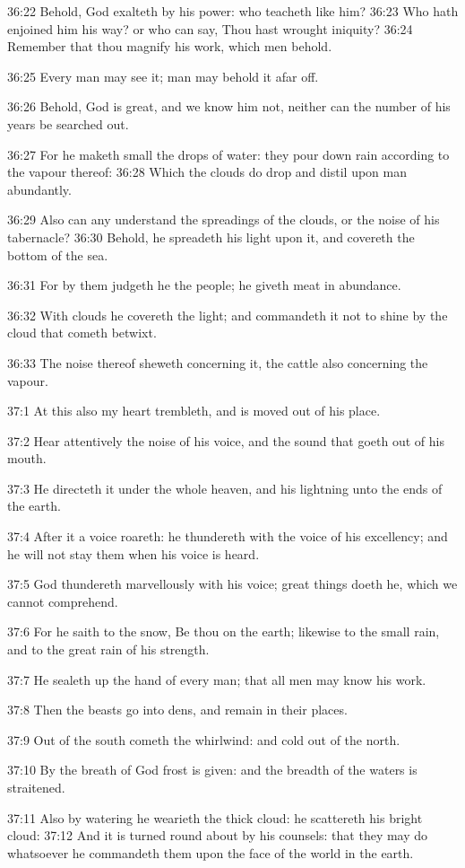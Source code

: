 36:22 Behold, God exalteth by his power: who teacheth like him?  36:23 Who hath enjoined him his way? or who can say, Thou hast wrought iniquity?  36:24 Remember that thou magnify his work, which men behold.

36:25 Every man may see it; man may behold it afar off.

36:26 Behold, God is great, and we know him not, neither can the number of his years be searched out.

36:27 For he maketh small the drops of water: they pour down rain according to the vapour thereof: 36:28 Which the clouds do drop and distil upon man abundantly.

36:29 Also can any understand the spreadings of the clouds, or the noise of his tabernacle?  36:30 Behold, he spreadeth his light upon it, and covereth the bottom of the sea.

36:31 For by them judgeth he the people; he giveth meat in abundance.

36:32 With clouds he covereth the light; and commandeth it not to shine by the cloud that cometh betwixt.

36:33 The noise thereof sheweth concerning it, the cattle also concerning the vapour.

37:1 At this also my heart trembleth, and is moved out of his place.

37:2 Hear attentively the noise of his voice, and the sound that goeth out of his mouth.

37:3 He directeth it under the whole heaven, and his lightning unto the ends of the earth.

37:4 After it a voice roareth: he thundereth with the voice of his excellency; and he will not stay them when his voice is heard.

37:5 God thundereth marvellously with his voice; great things doeth he, which we cannot comprehend.

37:6 For he saith to the snow, Be thou on the earth; likewise to the small rain, and to the great rain of his strength.

37:7 He sealeth up the hand of every man; that all men may know his work.

37:8 Then the beasts go into dens, and remain in their places.

37:9 Out of the south cometh the whirlwind: and cold out of the north.

37:10 By the breath of God frost is given: and the breadth of the waters is straitened.

37:11 Also by watering he wearieth the thick cloud: he scattereth his bright cloud: 37:12 And it is turned round about by his counsels: that they may do whatsoever he commandeth them upon the face of the world in the earth.

